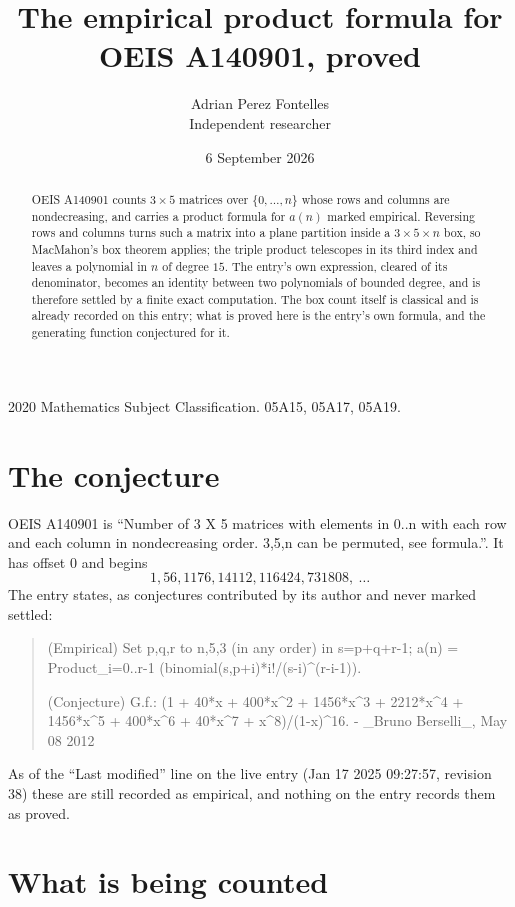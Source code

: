 \documentclass[11pt,a4paper]{article}
\title{The empirical product formula for OEIS A140901, proved}
\author{Adrian Perez Fontelles\\ \small Independent researcher}
\date{6 September 2026}
\theoremstyle{plain}
\theoremstyle{definition}
\begin{document}
\maketitle

\begin{abstract}
OEIS A140901 counts $3\times5$ matrices over $\{0,\dots,n\}$ whose rows and columns are
nondecreasing, and carries a product formula for $a(n)$ marked empirical. Reversing rows and
columns turns such a matrix into a plane partition inside a $3\times5\times n$ box, so
MacMahon's box theorem applies; the triple product telescopes in its third index and leaves a
polynomial in $n$ of degree $15$. The entry's own expression, cleared of its denominator,
becomes an identity between two polynomials of bounded degree, and is therefore settled by a
finite exact computation. The box count itself is classical and is already recorded on this
entry; what is proved here is the entry's own formula, and the generating function conjectured for it.
\end{abstract}

\noindent\small 2020 Mathematics Subject Classification. 05A15, 05A17, 05A19.\normalsize

\section{The conjecture}

OEIS A140901 is ``Number of 3 X 5 matrices with elements in 0..n with each row and each column in nondecreasing order. 3,5,n can be permuted, see formula.''. It has offset $0$ and begins
\[
1, 56, 1176, 14112, 116424, 731808,\ \dots
\]
The entry states, as conjectures contributed by its author and never marked settled:
\begin{quote}
(Empirical) Set p,q,r to n,5,3 (in any order) in s=p+q+r-1; a(n) = Product\_{i=0..r-1} (binomial(s,p+i)*i!/(s-i)\^{}(r-i-1)).

(Conjecture) G.f.: (1 + 40*x + 400*x\^{}2 + 1456*x\^{}3 + 2212*x\^{}4 + 1456*x\^{}5 + 400*x\^{}6 + 40*x\^{}7 + x\^{}8)/(1-x)\^{}16. - \_Bruno Berselli\_, May 08 2012

\end{quote}
As of the ``Last modified'' line on the live entry (Jan 17 2025 09:27:57, revision 38) these are still
recorded as empirical, and nothing on the entry records them as proved.

\section{What is being counted}
\end{document}
